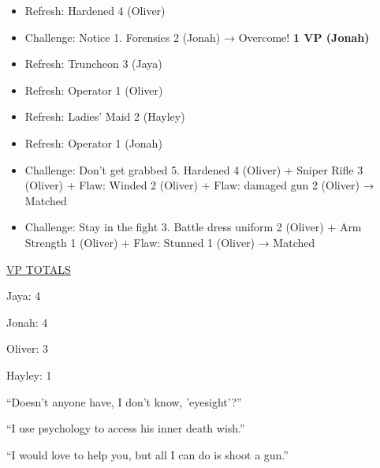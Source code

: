 \begin{itemize}
\item Refresh: Hardened 4 (Oliver)
\item Challenge: Notice 1.  Forensics 2 (Jonah) → Overcome! \textbf{1 VP (Jonah)}
\item Refresh: Truncheon 3 (Jaya)
\item Refresh: Operator 1 (Oliver)
\item Refresh: Ladies' Maid 2 (Hayley)
\item Refresh: Operator 1 (Jonah)
\item Challenge: Don't get grabbed 5.  Hardened 4 (Oliver) + Sniper Rifle 3 (Oliver) +  {\color[RGB]{255,0,0}Flaw: Winded 2 (Oliver)}  +  {\color[RGB]{255,0,0}Flaw: damaged gun 2 (Oliver)}  → Matched
\item Challenge: Stay in the fight 3.  Battle dress uniform 2 (Oliver) + Arm Strength 1 (Oliver) +  {\color[RGB]{255,0,0}Flaw: Stunned 1 (Oliver)}  → Matched
\end{itemize}





\underline{  {\LARGE VP TOTALS }  }

Jaya: 4

Jonah: 4

Oliver: 3

Hayley: 1







``Doesn't anyone have, I don't know, 'eyesight'?'' 




``I use psychology to access his inner death wish.'' 



``I would love to help you, but all I can do is shoot a gun.'' 


